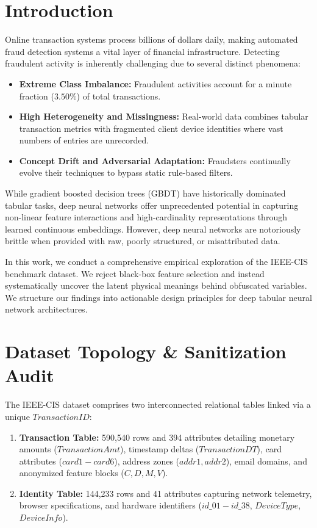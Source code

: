 \documentclass[conference]{IEEEtran}
\begin{document}
\section{Introduction}
Online transaction systems process billions of dollars daily, making automated fraud detection systems a vital layer of financial infrastructure. Detecting fraudulent activity is inherently challenging due to several distinct phenomena:
\begin{itemize}
    \item \textbf{Extreme Class Imbalance:} Fraudulent activities account for a minute fraction ($3.50\%$) of total transactions.
    \item \textbf{High Heterogeneity and Missingness:} Real-world data combines tabular transaction metrics with fragmented client device identities where vast numbers of entries are unrecorded.
    \item \textbf{Concept Drift and Adversarial Adaptation:} Fraudsters continually evolve their techniques to bypass static rule-based filters.
\end{itemize}

While gradient boosted decision trees (GBDT) have historically dominated tabular tasks, deep neural networks offer unprecedented potential in capturing non-linear feature interactions and high-cardinality representations through learned continuous embeddings. However, deep neural networks are notoriously brittle when provided with raw, poorly structured, or misattributed data. 

In this work, we conduct a comprehensive empirical exploration of the IEEE-CIS benchmark dataset. We reject black-box feature selection and instead systematically uncover the latent physical meanings behind obfuscated variables. We structure our findings into actionable design principles for deep tabular neural network architectures.

\section{Dataset Topology \& Sanitization Audit}
The IEEE-CIS dataset comprises two interconnected relational tables linked via a unique $TransactionID$:
\begin{enumerate}
    \item \textbf{Transaction Table:} 590,540 rows and 394 attributes detailing monetary amounts ($TransactionAmt$), timestamp deltas ($TransactionDT$), card attributes ($card1-card6$), address zones ($addr1, addr2$), email domains, and anonymized feature blocks ($C, D, M, V$).
    \item \textbf{Identity Table:} 144,233 rows and 41 attributes capturing network telemetry, browser specifications, and hardware identifiers ($id\_01-id\_38$, $DeviceType$, $DeviceInfo$).
\end{enumerate}
\end{document}
